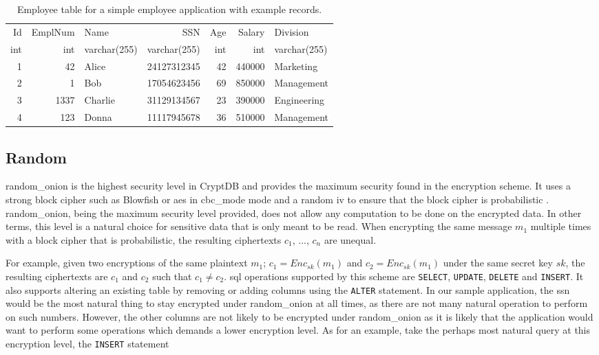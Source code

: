 \begin{table}[H]
\centering
\begin{tabular}{| r | r | l | r | r | r | l |}
\hline
  Id & EmplNum & Name & SSN & Age & Salary & Division \\
  int & int & varchar(255) & varchar(255) & int & int & varchar(255) \\
 \hline \hline
 1 & 42 & Alice & 24127312345 & 42 & 440000 & Marketing \\
 2 & 1 & Bob & 17054623456 & 69 & 850000 & Management \\
 3 & 1337 & Charlie & 31129134567 & 23 & 390000 & Engineering \\
 4 & 123 & Donna & 11117945678 & 36 & 510000 & Management \\
 \hline

\end{tabular}
\caption{Employee table for a simple employee application with example records.}
\label{demoapp_table}
\end{table}



\subsection{Random}

\Gls{random_onion} is the highest security level in CryptDB and provides the maximum security found in the encryption scheme. It uses a strong block cipher such as Blowfish or \Gls{aes} in \Gls{cbc_mode} mode and a random \gls{iv} to ensure that the block cipher is probabilistic \citep{CryptDB_Main_Paper}. \Gls{random_onion}, being the maximum security level provided, does not allow any computation to be done on the encrypted data. In other terms, this level is a natural choice for sensitive data that is only meant to be read. When encrypting the same message $m_1$ multiple times with a block cipher that is probabilistic, the resulting ciphertexts $c_1$, $...$, $c_n$ are unequal. 

For example, given two encryptions of the same plaintext $m_1$; $c_1 = Enc_{sk}(m_1)$ and $c_2 = Enc_{sk}(m_1)$ under the same secret key $sk$, the resulting ciphertexts are $c_1$ and $c_2$ such that $c_1 \neq c_2$. \gls{sql} operations supported by this scheme are \verb!SELECT!, \verb!UPDATE!, \verb!DELETE! and \verb!INSERT!. It also supports altering an existing table by removing or adding columns using the \verb!ALTER! statement. In our sample application, the \gls{ssn} would be the most natural thing to stay encrypted under \gls{random_onion} at all times, as there are not many natural operation to perform on such numbers. However, the other columns are not likely to be encrypted under \gls{random_onion} as it is likely that the application would want to perform some operations which demands a lower encryption level. As for an example, take the perhaps most natural query at this encryption level, the \verb!INSERT! statement

